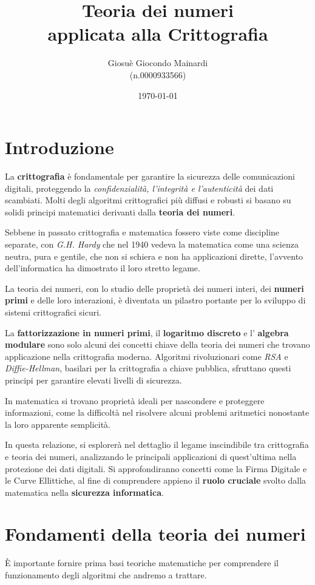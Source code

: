 \documentclass[a4paper,12pt]{report}
\title{Teoria dei numeri \\ applicata alla Crittografia}
\author{Giosuè Giocondo Mainardi\\ (n.0000933566)}
\date{\today}
\begin{document}
\maketitle

\tableofcontents
\chapter{Introduzione}
La \textbf{crittografia} è fondamentale per garantire la sicurezza delle comunicazioni digitali, proteggendo la \emph{confidenzialità, l'integrità e l'autenticità} dei dati scambiati. 
Molti degli algoritmi crittografici più diffusi e robusti si basano su solidi principi matematici derivanti dalla \textbf{teoria dei numeri}. 

Sebbene in passato crittografia e matematica fossero viste come discipline separate, con \emph{G.H. Hardy} che nel 1940 vedeva la matematica come una scienza neutra, pura e gentile,
che non si schiera e non ha applicazioni dirette, l'avvento dell'informatica ha dimostrato il loro stretto legame. 

La teoria dei numeri, con lo studio delle proprietà dei numeri interi, dei \textbf{numeri primi} e delle loro interazioni, è diventata un pilastro portante per lo sviluppo di sistemi crittografici sicuri.

La \textbf{fattorizzazione in numeri primi}, il \textbf{logaritmo discreto} e l' \textbf{algebra modulare} sono solo alcuni dei concetti chiave della teoria dei numeri che trovano 
applicazione nella crittografia moderna. Algoritmi rivoluzionari come \emph{RSA} e \emph{Diffie-Hellman}, basilari per la crittografia a chiave pubblica, sfruttano questi principi 
per garantire elevati livelli di sicurezza.  

In matematica si trovano proprietà ideali per nascondere e proteggere informazioni, come la difficoltà nel risolvere alcuni problemi aritmetici nonostante la loro apparente semplicità.

In questa relazione, si esplorerà nel dettaglio il legame inscindibile tra crittografia e teoria dei numeri, analizzando le principali applicazioni di quest'ultima nella protezione dei dati digitali. 
Si approfondiranno concetti come la Firma Digitale e le Curve Ellittiche, al fine di comprendere appieno il \textbf{ruolo cruciale} svolto dalla matematica nella \textbf{sicurezza informatica}.
%
%
%
%
\chapter{Fondamenti della teoria dei numeri}
È importante fornire prima basi teoriche matematiche per comprendere il funzionamento degli algoritmi che andremo a trattare.
\end{document}
